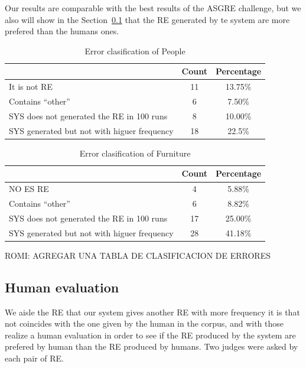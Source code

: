 Our results are comparable with the best results of the ASGRE challenge, but we also will show in the Section~\ref{sec:evaluation} that the RE generated by te system are more prefered than the humans ones.

\begin{table}[h!]
\begin{center}
\begin{tabular}{|l|c|c|}
\hline
		& Count		& Percentage\\
\hline
It is not RE	&	11	&	13.75\% \\
Contains ``other''	&	6	&	7.50\% \\
SYS does not generated the RE in 100 runs	&	8	&	10.00\% \\
SYS generated but not with higuer frequency	&	18	&	22.5\% \\
\hline
\end{tabular}
\caption{Error clasification of People}
\label{error-people}
\end{center}
\end{table}


\begin{table}[h!]
\begin{center}
\begin{tabular}{|l|c|c|}
\hline
			& Count		& Percentage\\
\hline
NO ES RE		&	4	&	5.88\% \\
Contains ``other''	&	6	&	8.82\% \\
SYS does not generated the RE in 100 runs	&	17	&	25.00\% \\
SYS generated but not with higuer frequency	&	28	&	41.18\% \\

\hline
\end{tabular}
\caption{Error clasification of Furniture}
\label{error-furniture}
\end{center}
\end{table}
ROMI: AGREGAR UNA TABLA DE CLASIFICACION DE ERRORES

\subsection{Human evaluation} \label{sec:evaluation}

We aisle the RE that our system gives another RE with more frequency it is that not coincides with the one given by the human in the corpus, and with those realize a human evaluation in order to see if the RE produced by the system are prefered by human than the RE produced by humans. Two judges were asked by each pair of RE.

